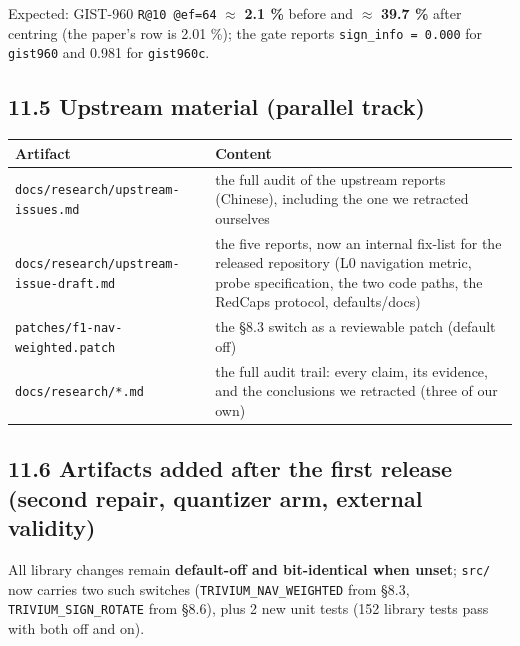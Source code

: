 \documentclass[
  10pt,
]{article}
\newcounter{none} %
\begin{document}
Expected: GIST-960 \texttt{R@10\ @ef=64} $\approx$ \textbf{2.1 \%} before and $\approx$
\textbf{39.7 \%} after centring (the paper's row is 2.01 \%); the gate
reports \texttt{sign\_info\ =\ 0.000} for \texttt{gist960} and 0.981 for
\texttt{gist960c}.

\subsection{11.5 Upstream material (parallel
track)}\label{upstream-material-parallel-track}

{\def\LTcaptype{none} %
\begin{longtable}[]{@{}
  >{\raggedright\arraybackslash}p{}
  >{\raggedright\arraybackslash}p{}@{}}
\toprule\noalign{}
\begin{minipage}[b]{\linewidth}\raggedright
Artifact
\end{minipage} & \begin{minipage}[b]{\linewidth}\raggedright
Content
\end{minipage} \\
\midrule\noalign{}
\endhead
\bottomrule\noalign{}
\endlastfoot
\texttt{docs/research/upstream-issues.md} & the full audit of the
upstream reports (Chinese), including the one we retracted ourselves \\
\texttt{docs/research/upstream-issue-draft.md} & the five reports, now
an internal fix-list for the released repository (L0 navigation metric,
probe specification, the two code paths, the RedCaps protocol,
defaults/docs) \\
\texttt{patches/f1-nav-weighted.patch} & the §8.3 switch as a reviewable
patch (default off) \\
\texttt{docs/research/*.md} & the full audit trail: every claim, its
evidence, and the conclusions we retracted (three of our own) \\
\end{longtable}
}

\subsection{11.6 Artifacts added after the first release (second repair,
quantizer arm, external
validity)}\label{artifacts-added-after-the-first-release-second-repair-quantizer-arm-external-validity}

All library changes remain \textbf{default-off and bit-identical when
unset}; \texttt{src/} now carries two such switches
(\texttt{TRIVIUM\_NAV\_WEIGHTED} from §8.3,
\texttt{TRIVIUM\_SIGN\_ROTATE} from §8.6), plus 2 new unit tests (152
library tests pass with both off and on).
\end{document}
